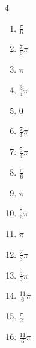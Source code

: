 \begin{multicols}{4}
\begin{enumerate}
  \item $\displaystyle \frac{\pi}{6}$

  \item $\displaystyle \frac{7}{6}\pi$

  \item $\displaystyle \pi$

  \item $\displaystyle \frac{3}{4}\pi$

  \item $\displaystyle 0$

  \item $\displaystyle \frac{7}{4}\pi$

  \item $\displaystyle \frac{5}{4}\pi$

\columnbreak %

  \item $\displaystyle \frac{\pi}{6}$

  \item $\displaystyle \pi$

  \item $\displaystyle \frac{5}{6}\pi$

  \item $\displaystyle \pi$

  \item $\displaystyle \frac{2}{3}\pi$

  \item $\displaystyle \frac{5}{3}\pi$

  \item $\displaystyle \frac{11}{6}\pi$

  \item $\displaystyle \frac{\pi}{2}$

  \item $\displaystyle \frac{11}{6}\pi$


\end{enumerate}
\end{multicols}
